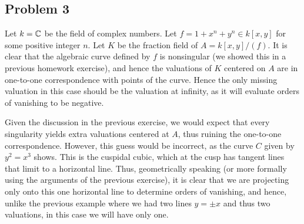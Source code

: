 \documentclass{../../mathnotes}
\begin{document}
\subsection*{Problem 3}

Let $k=\mathbb{C}$ be the field of complex numbers. Let $f=1+x^n+y^n\in k[x,y]$ for some positive integer $n$. Let $K$ be the
fraction field of $A=k[x,y]/(f)$. It is clear that the algebraic curve defined by $f$ is nonsingular (we showed this in a previous
homework exercise), and hence the valuations of $K$ centered on $A$ are in one-to-one correspondence with points of the curve.
Hence the only missing valuation in this case should be the valuation at infinity, as it will evaluate orders of vanishing to be negative.

Given the discussion in the previous exercise, we would expect that every singularity yields extra valuations centered at $A$, thus ruining
the one-to-one correspondence. However, this guess would be incorrect, as the curve $C$ given by $y^2=x^3$ shows. This is the cuspidal cubic, which
at the cusp has tangent lines that limit to a horizontal line. Thus, geometrically speaking (or more formally using the arguments of the previous
exercise), it is clear that we are projecting only onto this one horizontal line to determine orders of vanishing, and hence, unlike the previous
example where we had two lines $y=\pm x$ and thus two valuations, in this case we will have only one.
\end{document}
